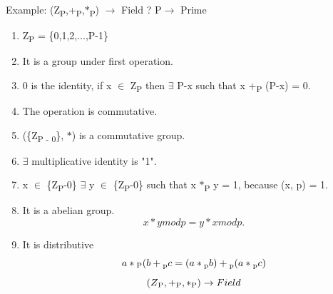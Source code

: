 \documentclass[11pt]{article}
\begin{document}
	Example: (Z\textsubscript{P},+\textsubscript{P},$\ast$\textsubscript{P}) $\rightarrow$ Field ? \hfill P$\rightarrow$ Prime
	\begin{enumerate}
		\item Z\textsubscript{P} = \{0,1,2,...,P-1\}
		\item It is a group under first operation.
		\item 0 is the identity, if x $\in$ Z\textsubscript{P} then $\exists$ P-x such that x +\textsubscript{P} (P-x) = 0.
		\item The operation is commutative.
		\item (\{Z\textsubscript{P - 0}\}, $\ast$) is a commutative group.
		\item $\exists$ multiplicative identity is "1".
		\item x $\in$ \{Z\textsubscript{P}-0\} $\exists$ y $\in$ \{Z\textsubscript{P}-0\} such that x $\ast$\textsubscript{P}
		y = 1, because (x, p) = 1.
		\item It is a abelian group. $$ x \ast y mod p = y \ast x mod p.$$
		\item It is distributive $$ a \ast \textsubscript{P}(b +\textsubscript{p} c = ( a \ast\textsubscript{p}  b) +\textsubscript{p} ( a \ast\textsubscript{p}  c) $$
		$$ (Z\textsubscript{P}, +\textsubscript{P}, \ast \textsubscript{P}) \rightarrow Field$$ 
		
	\end{enumerate}
	
\end{document}
